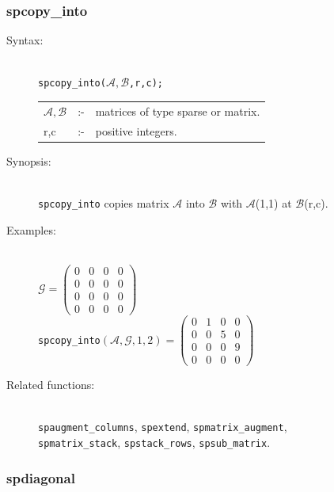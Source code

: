 \subsubsection{spcopy\_into}
\label{sparse:spcopy_into}
\hypertarget{operator:SPCOPY_INTO}{}

\begin{description}
\item[Syntax:]\mbox{}\\
{\tt spcopy\_into($\mathcal{A,B}$,r,c);}\\[2mm]
\begin{tabular}{l l l}
$\mathcal{A,B}$ &:-& matrices of type sparse or matrix. \\
r,c          &:-& positive integers.
\end{tabular}

\item[Synopsis:]\mbox{}\\
 \texttt{spcopy\_into} copies matrix $\mathcal{A}$ into
                $\mathcal{B}$ with $\mathcal{A}$(1,1) at $\mathcal{B}$(r,c).

\item[Examples:]\mbox{}\\
\(\mathcal{G} = \begin{pmatrix} 0 & 0 & 0 & 0 \\ 0 & 0 & 0 & 0 \\
0 & 0 & 0 & 0 \\ 0 & 0 & 0 & 0
\end{pmatrix}\) \\[2mm]
\texttt{spcopy\_into}\((\mathcal{A,G},1,2)  =
\begin{pmatrix} 0 & 1 & 0 & 0 \\ 0 & 0 & 5 & 0 \\ 0 & 0 & 0
& 9 \\ 0 & 0 & 0 & 0
\end{pmatrix}\)

\item[Related functions:]\mbox{}\\
\texttt{spaugment\_columns}, \texttt{spextend}, \texttt{spmatrix\_augment},\\
\texttt{spmatrix\_stack}, \texttt{spstack\_rows}, \texttt{spsub\_matrix}.
\end{description}


\subsubsection{spdiagonal}
\label{sparse:spdiagonal}
\hypertarget{operator:SPDIAGONAL}{}

